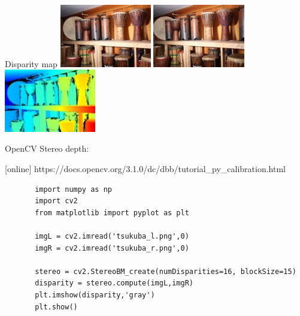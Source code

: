 \documentclass[aspectratio=169]{beamer}
\begin{document}
\begin{frame}{Disparity map}
    \centering
    \includegraphics[width=0.3\textwidth]{images/im0.jpg}
    \includegraphics[width=0.3\textwidth]{images/im1.jpg}
    \includegraphics[width=0.3\textwidth]{images/disp0.jpg}
\end{frame}


\begin{frame}[fragile]{OpenCV}
    Stereo depth:
    \begin{thebibliography}{9}
        [online]
        \small https://docs.opencv.org/3.1.0/dc/dbb/tutorial\_py\_calibration.html
    \end{thebibliography}
    \begin{verbatim}
       import numpy as np
       import cv2
       from matplotlib import pyplot as plt
       
       imgL = cv2.imread('tsukuba_l.png',0)
       imgR = cv2.imread('tsukuba_r.png',0)
       
       stereo = cv2.StereoBM_create(numDisparities=16, blockSize=15)
       disparity = stereo.compute(imgL,imgR)
       plt.imshow(disparity,'gray')
       plt.show()
    \end{verbatim}
\end{frame}
\end{document}
